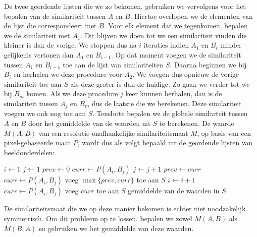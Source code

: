 De twee geordende lijsten die we zo bekomen, gebruiken we vervolgens voor het bepalen van 
de similariteit tussen $A$ en $B$. Hiertoe overlopen we de elementen van de 
lijst die correspondeert met $B$. Voor
elk element dat we tegenkomen, bepalen we de similariteit met $A_1$. Dit blijven we doen
tot we een similariteit vinden die kleiner is dan de vorige. We stoppen dus na $i$ iteraties 
indien $A_1$ en $B_i$ minder gelijkenis vertonen dan $A_1$ en $B_{i-1}$. Op dat moment voegen
we de similariteit tussen $A_1$ en $B_{i-1}$ toe aan de lijst van similariteiten $S$. Daarna
beginnen we bij $B_i$ en herhalen we deze procedure voor $A_2$. We voegen dus opnieuw de vorige
similariteit toe aan $S$ als deze groter is dan de huidige. Zo gaan we verder tot we bij
$B_m$ komen. Als we deze procedure $j$ keer kunnen herhalen, dan
is de similariteit tussen $A_j$ en $B_m$ dus de laatste die we berekenen. Deze similariteit
voegen we ook nog toe aan $S$. Tenslotte bepalen we de globale similarteit tussen $A$ en $B$ 
door het gemiddelde van de waarden uit $S$ te berekenen. De waarde $M(A,B)$ van een 
resolutie-onafhankelijke similariteitsmaat $M$, op basis van een 
pixel-gebaseerde maat $P$, wordt dus als volgt bepaald uit de geordende lijsten van
beeldonderdelen:
\begin{multicols}{2}
\begin{algorithmic}[1]
\STATE $i \leftarrow 1$
\STATE $j \leftarrow 1$
\STATE $prev \leftarrow 0$
\STATE $curr \leftarrow P(A_i,B_j)$
\STATE $j \leftarrow j+1$
\STATE $prev \leftarrow curr$
\STATE $curr \leftarrow P(A_i,B_j)$
\ENDWHILE
\STATE voeg $\max \{prev, curr\}$ toe aan $S$
\STATE $i \leftarrow i+1$
\ENDWHILE
{}
\STATE $curr \leftarrow P(A_i,B_j)$
\STATE voeg $curr$ toe aan $S$
\ENDIF
\RETURN gemiddelde van de waarden in $S$
\end{algorithmic}
\end{multicols}
\noindent
De similariteitsmaat die we op deze manier bekomen is echter niet noodzakelijk symmetrisch. Om dit 
probleem op te lossen, bepalen we zowel $M(A,B)$ als $M(B,A)$ en gebruiken we het gemiddelde van 
deze waarden.

